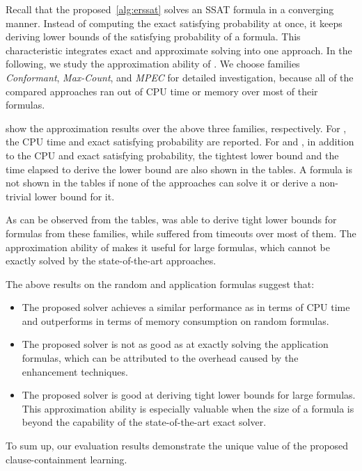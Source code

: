 Recall that the proposed~\cref{alg:erssat} solves an SSAT formula in a converging manner.
Instead of computing the exact satisfying probability at once,
it keeps deriving lower bounds of the satisfying probability of a formula.
This characteristic integrates exact and approximate solving into one approach.
In the following, we study the approximation ability of \erssat.
We choose families \textit{Conformant}, \textit{Max-Count}, and \textit{MPEC} for detailed investigation,
because all of the compared approaches ran out of CPU time or memory over most of their formulas.

show the approximation results over the above three families, respectively.
For \dcssat, the CPU time and exact satisfying probability are reported.
For \erssat and \erssatb, in addition to the CPU and exact satisfying probability,
the tightest lower bound and the time elapsed to derive the lower bound are also shown in the tables.
A formula is not shown in the tables
if none of the approaches can solve it or derive a non-trivial lower bound for it.

As can be observed from the tables,
\erssat was able to derive tight lower bounds for formulas from these families,
while \dcssat suffered from timeouts over most of them.
The approximation ability of \erssat makes it useful for large formulas,
which cannot be exactly solved by the state-of-the-art approaches.

The above results on the random and application formulas suggest that:
\begin{itemize}
    \item The proposed solver \erssat achieves a similar performance as \dcssat in terms of CPU time and outperforms \dcssat in terms of memory consumption on random formulas.
    \item The proposed solver \erssat is not as good as \dcssat at exactly solving the application formulas, which can be attributed to the overhead caused by the enhancement techniques.
    \item The proposed solver \erssat is good at deriving tight lower bounds for large formulas. This approximation ability is especially valuable when the size of a formula is beyond the capability of the state-of-the-art exact solver.
\end{itemize}
To sum up, our evaluation results demonstrate the unique value of the proposed clause-containment learning.
